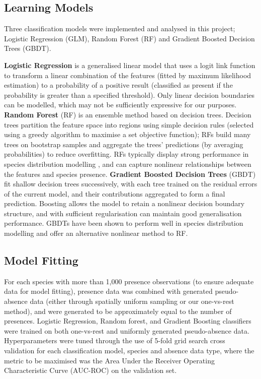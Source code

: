 \documentclass{article}
\begin{document}
\subsection{Learning Models}\vspace{-0.4em}

Three classification models were implemented and analysed in this project; Logistic Regression (GLM), Random Forest (RF) and Gradient Boosted Decision Trees (GBDT). 

\textbf{Logistic Regression} is a generalised linear model that uses a logit link function to transform a linear combination of the features (fitted by maximum likelihood estimation) to a probability of a positive result (classified as present if the probability is greater than a specified threshold). Only linear decision boundaries can be modelled, which may not be sufficiently expressive for our purposes. 
\textbf{Random Forest} (RF) is an ensemble method based on decision trees. Decision trees partition the feature space into regions using simple decision rules (selected using a greedy algorithm to maximise a set objective function); RFs build many trees on bootstrap samples and aggregate the trees' predictions (by averaging probabilities) to reduce overfitting. RFs typically display strong performance in species distribution modelling \cite{Elith_2022}, and can capture nonlinear relationships between the features and species presence. 
\textbf{Gradient Boosted Decision Trees} (GBDT) fit shallow decision trees successively, with each tree trained on the residual errors of the current model, and their contributions aggregated to form a final prediction. Boosting allows the model to retain a nonlinear decision boundary structure, and with sufficient regularisation can maintain good generalisation performance. GBDTs have been shown to perform well in species distribution modelling \cite{Elith_2006} and offer an alternative nonlinear method to RF. \vspace{-0.4em}

\subsection{Model Fitting}\vspace{-0.4em}
\label{hyperparams}
For each species with more than 1,000 presence observations (to ensure adequate data for model fitting), presence data was combined with generated pseudo-absence data (either through spatially uniform sampling or our one-vs-rest method), and were generated to be approximately equal to the number of presences. Logistic Regression, Random forest, and Gradient Boosting classifiers were trained on both one-vs-rest and uniformly generated pseudo-absence data. Hyperparameters were tuned through the use of 5-fold grid search cross validation \cite{GridSearch_CV} for each classification model, species and absence data type, where the metric to be maximised was the Area Under the Receiver Operating Characteristic Curve (AUC-ROC) on the validation set.
\end{document}
